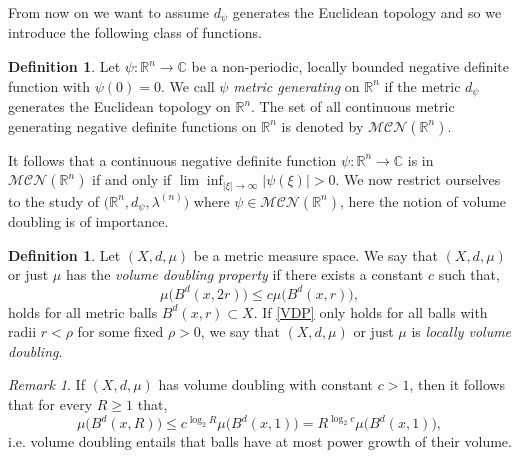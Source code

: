 \documentclass[a4paper, 12pt]{report}
\theoremstyle{remark}
\newtheorem{remark}[theorem]{Remark}
\theoremstyle{definition}
\newtheorem{definition}[theorem]{Definition}
\begin{document}
From now on we want to assume $d_\psi$ generates the Euclidean topology and so we introduce the following class of functions.
\begin{definition}
Let $\psi : \mathbb{R}^n \to \mathbb{C}$ be a non-periodic, locally bounded negative definite function with $\psi(0) = 0$.  We call $\psi$ \emph{metric generating} on $\mathbb{R}^n$ if the metric $d_\psi$ generates the Euclidean topology on $\mathbb{R}^n$.  The set of all continuous metric generating negative definite functions on $\mathbb{R}^n$ is denoted by $\mathcal{MCN}(\mathbb{R}^n)$.
\end{definition}
It follows that a continuous negative definite function $\psi : \mathbb{R}^n \to \mathbb{C}$ is in $\mathcal{MCN}(\mathbb{R}^n)$ if and only if $\lim\inf_{|\xi| \to \infty}|\psi(\xi)| > 0$.  We now restrict ourselves to the study of $\big(\mathbb{R}^n, d_\psi, \lambda^{(n)}\big)$ where $\psi \in \mathcal{MCN}(\mathbb{R}^n)$, here the notion of volume doubling is of importance.
\begin{definition}
Let $(X, d, \mu)$ be a metric measure space.  We say that $(X, d, \mu)$ or just $\mu$ has the \emph{volume doubling property} if there exists a constant $c$ such that,
\begin{equation}\label{VDP}
\mu\big(B^d(x, 2r)\big) \le c\mu\big(B^d(x, r)\big),
\end{equation}
holds for all metric balls $B^d(x, r) \subset X$.  If \eqref{VDP} only holds for all balls with radii $r < \rho$ for some fixed $\rho > 0$, we say that $(X, d, \mu)$ or just $\mu$ is \emph{locally volume doubling}.
\end{definition}
\begin{remark}
If $(X, d, \mu)$ has volume doubling with constant $c > 1$, then it follows that for every $R \ge 1$ that,
$$
\mu\big(B^d(x, R)\big) \le c^{\log_2R}\mu\big(B^d(x, 1)\big) = R^{\log_2c}\mu\big(B^d(x, 1)\big),
$$
i.e. volume doubling entails that balls have at most power growth of their volume.
\end{remark}
\end{document}
